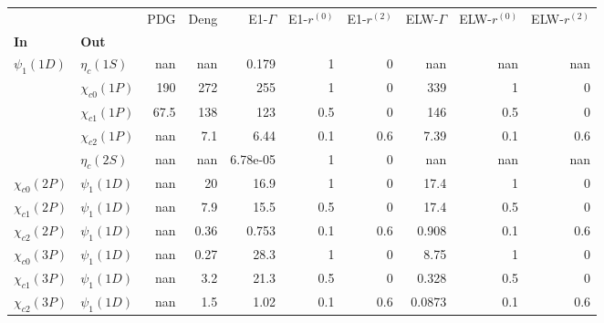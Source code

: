 \begin{tabular}{l|l|r|r|r|r|r|r|r|r}
\toprule
                &                &  PDG &  Deng &  E1-$\Gamma$ &  E1-$r^{(0)}$ &  E1-$r^{(2)}$ &  ELW-$\Gamma$ &  ELW-$r^{(0)}$ &  ELW-$r^{(2)}$ \\
\textbf{In} & \textbf{Out} &      &       &              &               &               &               &                &                \\
\midrule
\textbf{$\psi_{1}(1D)$} & \textbf{$\eta_{c}(1S)$} &  nan &   nan &        0.179 &             1 &             0 &           nan &            nan &            nan \\
                & \textbf{$\chi_{c0}(1P)$} &  190 &   272 &          255 &             1 &             0 &           339 &              1 &              0 \\
                & \textbf{$\chi_{c1}(1P)$} & 67.5 &   138 &          123 &           0.5 &             0 &           146 &            0.5 &              0 \\
                & \textbf{$\chi_{c2}(1P)$} &  nan &   7.1 &         6.44 &           0.1 &           0.6 &          7.39 &            0.1 &            0.6 \\
                & \textbf{$\eta_{c}(2S)$} &  nan &   nan &     6.78e-05 &             1 &             0 &           nan &            nan &            nan \\
\textbf{$\chi_{c0}(2P)$} & \textbf{$\psi_{1}(1D)$} &  nan &    20 &         16.9 &             1 &             0 &          17.4 &              1 &              0 \\
\textbf{$\chi_{c1}(2P)$} & \textbf{$\psi_{1}(1D)$} &  nan &   7.9 &         15.5 &           0.5 &             0 &          17.4 &            0.5 &              0 \\
\textbf{$\chi_{c2}(2P)$} & \textbf{$\psi_{1}(1D)$} &  nan &  0.36 &        0.753 &           0.1 &           0.6 &         0.908 &            0.1 &            0.6 \\
\textbf{$\chi_{c0}(3P)$} & \textbf{$\psi_{1}(1D)$} &  nan &  0.27 &         28.3 &             1 &             0 &          8.75 &              1 &              0 \\
\textbf{$\chi_{c1}(3P)$} & \textbf{$\psi_{1}(1D)$} &  nan &   3.2 &         21.3 &           0.5 &             0 &         0.328 &            0.5 &              0 \\
\textbf{$\chi_{c2}(3P)$} & \textbf{$\psi_{1}(1D)$} &  nan &   1.5 &         1.02 &           0.1 &           0.6 &        0.0873 &            0.1 &            0.6 \\
\bottomrule
\end{tabular}
